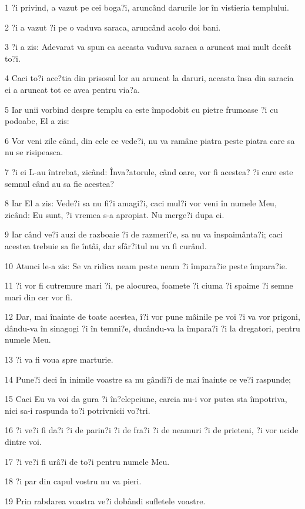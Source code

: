 \par 1 ?i privind, a vazut pe cei boga?i, aruncând darurile lor în vistieria templului.
\par 2 ?i a vazut ?i pe o vaduva saraca, aruncând acolo doi bani.
\par 3 ?i a zis: Adevarat va spun ca aceasta vaduva saraca a aruncat mai mult decât to?i.
\par 4 Caci to?i ace?tia din prisosul lor au aruncat la daruri, aceasta însa din saracia ei a aruncat tot ce avea pentru via?a.
\par 5 Iar unii vorbind despre templu ca este împodobit cu pietre frumoase ?i cu podoabe, El a zis:
\par 6 Vor veni zile când, din cele ce vede?i, nu va ramâne piatra peste piatra care sa nu se risipeasca.
\par 7 ?i ei L-au întrebat, zicând: Înva?atorule, când oare, vor fi acestea? ?i care este semnul când au sa fie acestea?
\par 8 Iar El a zis: Vede?i sa nu fi?i amagi?i, caci mul?i vor veni în numele Meu, zicând: Eu sunt, ?i vremea s-a apropiat. Nu merge?i dupa ei.
\par 9 Iar când ve?i auzi de razboaie ?i de razmeri?e, sa nu va înspaimânta?i; caci acestea trebuie sa fie întâi, dar sfâr?itul nu va fi curând.
\par 10 Atunci le-a zis: Se va ridica neam peste neam ?i împara?ie peste împara?ie.
\par 11 ?i vor fi cutremure mari ?i, pe alocurea, foamete ?i ciuma ?i spaime ?i semne mari din cer vor fi.
\par 12 Dar, mai înainte de toate acestea, î?i vor pune mâinile pe voi ?i va vor prigoni, dându-va în sinagogi ?i în temni?e, ducându-va la împara?i ?i la dregatori, pentru numele Meu.
\par 13 ?i va fi voua spre marturie.
\par 14 Pune?i deci în inimile voastre sa nu gândi?i de mai înainte ce ve?i raspunde;
\par 15 Caci Eu va voi da gura ?i în?elepciune, careia nu-i vor putea sta împotriva, nici sa-i raspunda to?i potrivnicii vo?tri.
\par 16 ?i ve?i fi da?i ?i de parin?i ?i de fra?i ?i de neamuri ?i de prieteni, ?i vor ucide dintre voi.
\par 17 ?i ve?i fi urâ?i de to?i pentru numele Meu.
\par 18 ?i par din capul vostru nu va pieri.
\par 19 Prin rabdarea voastra ve?i dobândi sufletele voastre.
